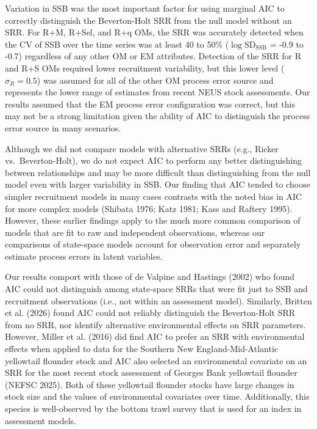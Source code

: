 \documentclass[
  12pt,
]{article}
\begin{document}
Variation in SSB was the most important factor for using marginal AIC to
correctly distinguish the Beverton-Holt SRR from the null model without
an SRR. For R+M, R+Sel, and R+q OMs, the SRR was accurately detected
when the CV of SSB over the time series was at least 40 to 50\%
(\(\log \text{SD}_{\text{SSB}}\) = -0.9 to -0.7) regardless of any other
OM or EM attributes. Detection of the SRR for R and R+S OMs required
lower recruitment variability, but this lower level (\(\sigma_R = 0.5\))
was assumed for all of the other OM process error source and represents
the lower range of estimates from recent NEUS stock assessments. Our
results assumed that the EM process error configuration was correct, but
this may not be a strong limitation given the ability of AIC to
distinguish the process error source in many scenarios.

Although we did not compare models with alternative SRRs (e.g., Ricker
vs.~Beverton-Holt), we do not expect AIC to perform any better
distinguishing between relationships and may be more difficult than
distinguishing from the null model even with larger variability in SSB.
Our finding that AIC tended to choose simpler recruitment models in many
cases contrasts with the noted bias in AIC for more complex models
(Shibata 1976; Katz 1981; Kass and Raftery 1995). However, these earlier
findings apply to the much more common comparison of models that are fit
to raw and independent observations, whereas our comparisons of
state-space models account for observation error and separately estimate
process errors in latent variables.

Our results comport with those of {de Valpine and Hastings} (2002) who
found AIC could not distinguish among state-space SRRs that were fit
just to SSB and recruitment observations (i.e., not within an assessment
model). Similarly, Britten et al. (2026) found AIC could not reliably
distinguish the Beverton-Holt SRR from no SRR, nor identify alternative
environmental effects on SRR parameters. However, Miller et al. (2016)
did find AIC to prefer an SRR with environmental effects when applied to
data for the Southern New England-Mid-Atlantic yellowtail flounder stock
and AIC also selected an environmental covariate on an SRR for the most
recent stock assessment of Georges Bank yellowtail flounder (NEFSC
2025). Both of these yellowtail flounder stocks have large changes in
stock size and the values of environmental covariates over time.
Additionally, this species is well-observed by the bottom trawl survey
that is used for an index in assessment models.
\end{document}
